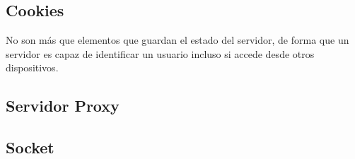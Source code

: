 \subsection{Cookies}
\noindent No son más que elementos que guardan el estado del servidor, de forma que un servidor es capaz de identificar un usuario incluso si accede desde otros dispositivos.
\subsection{Servidor Proxy}
\subsection{Socket}